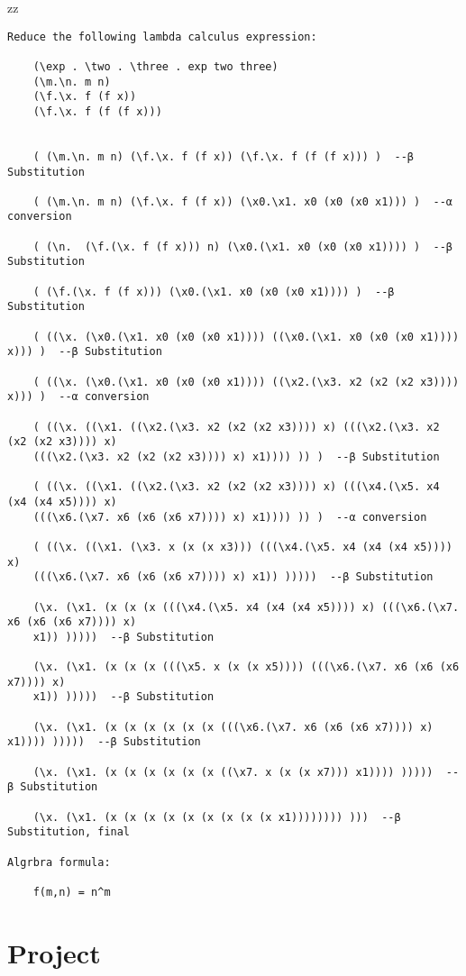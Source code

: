 zz\documentclass{article}
\theoremstyle{theorem}
\theoremstyle{definition}
\theoremstyle{remark}
\begin{document}
\begin{verbatim}
Reduce the following lambda calculus expression:

    (\exp . \two . \three . exp two three)
    (\m.\n. m n)
    (\f.\x. f (f x))
    (\f.\x. f (f (f x)))

 
    ( (\m.\n. m n) (\f.\x. f (f x)) (\f.\x. f (f (f x))) )  --β Substitution

    ( (\m.\n. m n) (\f.\x. f (f x)) (\x0.\x1. x0 (x0 (x0 x1))) )  --α conversion

    ( (\n.  (\f.(\x. f (f x))) n) (\x0.(\x1. x0 (x0 (x0 x1)))) )  --β Substitution

    ( (\f.(\x. f (f x))) (\x0.(\x1. x0 (x0 (x0 x1)))) )  --β Substitution

    ( ((\x. (\x0.(\x1. x0 (x0 (x0 x1)))) ((\x0.(\x1. x0 (x0 (x0 x1)))) x))) )  --β Substitution

    ( ((\x. (\x0.(\x1. x0 (x0 (x0 x1)))) ((\x2.(\x3. x2 (x2 (x2 x3)))) x))) )  --α conversion

    ( ((\x. ((\x1. ((\x2.(\x3. x2 (x2 (x2 x3)))) x) (((\x2.(\x3. x2 (x2 (x2 x3)))) x) 
    (((\x2.(\x3. x2 (x2 (x2 x3)))) x) x1)))) )) )  --β Substitution

    ( ((\x. ((\x1. ((\x2.(\x3. x2 (x2 (x2 x3)))) x) (((\x4.(\x5. x4 (x4 (x4 x5)))) x) 
    (((\x6.(\x7. x6 (x6 (x6 x7)))) x) x1)))) )) )  --α conversion

    ( ((\x. ((\x1. (\x3. x (x (x x3))) (((\x4.(\x5. x4 (x4 (x4 x5)))) x) 
    (((\x6.(\x7. x6 (x6 (x6 x7)))) x) x1)) )))))  --β Substitution

    (\x. (\x1. (x (x (x (((\x4.(\x5. x4 (x4 (x4 x5)))) x) (((\x6.(\x7. x6 (x6 (x6 x7)))) x) 
    x1)) )))))  --β Substitution

    (\x. (\x1. (x (x (x (((\x5. x (x (x x5)))) (((\x6.(\x7. x6 (x6 (x6 x7)))) x) 
    x1)) )))))  --β Substitution

    (\x. (\x1. (x (x (x (x (x (x (((\x6.(\x7. x6 (x6 (x6 x7)))) x) x1)))) )))))  --β Substitution

    (\x. (\x1. (x (x (x (x (x (x ((\x7. x (x (x x7))) x1)))) )))))  --β Substitution

    (\x. (\x1. (x (x (x (x (x (x (x (x (x x1)))))))) )))  --β Substitution, final

Algrbra formula:

    f(m,n) = n^m
\end{verbatim}




\section{Project}
\end{document}
